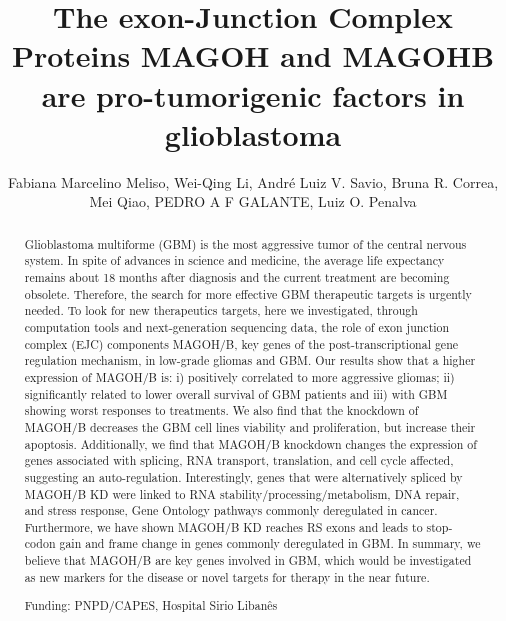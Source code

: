 \documentclass[twoside]{article}
\title{\vspace{-15mm}\fontsize{24pt}{10pt}\selectfont\textbf{ The exon-Junction Complex Proteins MAGOH and MAGOHB are pro-tumorigenic factors in glioblastoma }} %
\author{ Fabiana Marcelino Meliso, Wei-Qing Li, Andr\'e Luiz V. Savio, Bruna R. Correa, Mei Qiao, PEDRO A F GALANTE, Luiz O. Penalva }
\affil{ Hospital Sirio Liban\^es }
\date{}
\begin{document}
  
  
  \maketitle %
  
  
  \thispagestyle{fancy} %
  
  
  \begin{abstract}
  Glioblastoma multiforme (GBM) is the most aggressive tumor of the central nervous system. In spite of advances in science and medicine,  the average life expectancy remains about 18 months after diagnosis and the current treatment are becoming obsolete. Therefore,  the search for more effective GBM therapeutic targets is urgently needed. To look for new therapeutics targets,  here we investigated,  through computation tools and next-generation sequencing data,  the role of exon junction complex (EJC) components MAGOH/B,  key genes of the post-transcriptional gene regulation mechanism,  in low-grade gliomas and GBM. Our results show that a higher expression of MAGOH/B is: i) positively correlated to more aggressive gliomas; ii) significantly related to lower overall survival of GBM patients and iii) with GBM showing worst responses to treatments. We also find that the knockdown of MAGOH/B decreases the GBM cell lines viability and proliferation,  but increase their apoptosis. Additionally,  we find that MAGOH/B knockdown changes the expression of genes associated with splicing,  RNA transport,  translation,  and cell cycle affected,  suggesting an auto-regulation. Interestingly,  genes that were alternatively spliced by MAGOH/B  KD  were  linked to  RNA  stability/processing/metabolism,   DNA  repair,  and stress response,  Gene Ontology  pathways commonly deregulated in cancer. Furthermore,  we have shown MAGOH/B KD reaches RS exons and leads to stop-codon gain and frame change in genes commonly deregulated in GBM. In summary,  we believe that MAGOH/B are key genes involved in GBM,  which would be investigated as new markers for the disease or novel targets for therapy in the near future.
  
  Funding: PNPD/CAPES,  Hospital Sirio Liban\^es \\ 
  \end{abstract}
  
\end{document}
